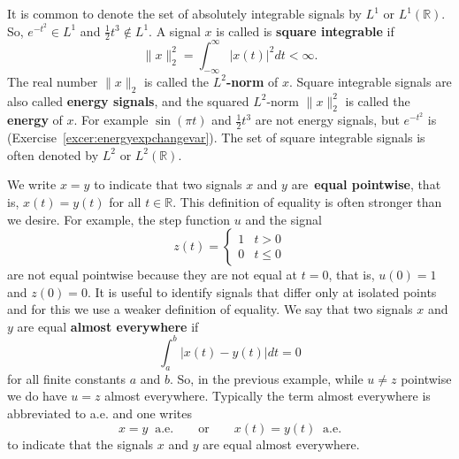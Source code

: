 \documentclass[11pt,a4paper]{book}
\theoremstyle{plain}
\numberwithin{equation}{section}
\newcommand{\reals}{{\mathbb R}}
\newcommand{\ints}{{\mathbb Z}}
\newcommand{\term}{\textbf}
\newcommand{\abs}[1]{\left\vert #1 \right\vert}
\begin{document}
It is common to denote the set of absolutely integrable signals by $L^1$ or $L^1(\reals)$.  So, $e^{-t^2} \in L^1$ and $\tfrac{1}{2}t^3 \notin L^1$.   A signal $x$ is called is \term{square integrable} if
\[
\|x\|_2^2 = \int_{-\infty}^{\infty} \abs{x(t)}^2 dt < \infty.
\]
The real number $\|x\|_2$ is called the \term{$L^2$-norm} of $x$.  Square integrable signals are also called \term{energy signals}, and the squared $L^2$-norm $\|x\|_2^2$ is called the \term{energy} of $x$. For example $\sin( \pi t)$ and $\tfrac{1}{2}t^3$ are not energy signals, but $e^{-t^2}$ is (Exercise~\ref{excer:energyexpchangevar}).  The set of square integrable signals is often denoted by $L^2$ or $L^2(\reals)$.  %

We write $x = y$ to indicate that two signals $x$ and $y$ are~\term{equal pointwise}, that is, $x(t) = y(t)$ for all $t \in \reals$.  This definition of equality is often stronger than we desire.  For example, the step function $u$ and the signal
\[
z(t) = \begin{cases}
1 & t > 0 \\
0 & t \leq 0
\end{cases}
\]
are not equal pointwise because they are not equal at $t=0$, that is, $u(0) = 1$ and $z(0) = 0$. %
It is useful to identify signals that differ only at isolated points and for this we use a weaker definition of equality.  We say that two signals $x$ and $y$ are equal \term{almost everywhere} if
\[
\int_{a}^b \abs{ x(t) - y(t) } dt = 0
\]
for all finite constants $a$ and $b$.  So, in the previous example, while $u \neq z$ pointwise we do have $u = z$ almost everywhere.  Typically the term almost everywhere is abbreviated to a.e. and one writes 
\[
x = y \;\; \text{a.e.} \qquad \text{or} \qquad x(t) = y(t) \;\; \text{a.e.}
\] 
to indicate that the signals $x$ and $y$ are equal almost everywhere.  %
\end{document}
